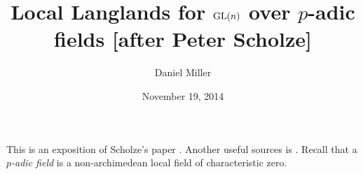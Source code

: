 \documentclass{article}
\title{Local Langlands for \texorpdfstring{$\operatorname{GL}(n)$}{GL(n)} over \texorpdfstring{$p$}{p}-adic fields [after Peter Scholze]}
\author{Daniel Miller}
\date{November 19, 2014}
\begin{document}
\maketitle





This is an exposition of Scholze's paper \cite{scholze-2013}. Another useful 
sources is \cite{vogan-1993}. Recall that a \emph{$p$-adic field} is a 
non-archimedean local field of characteristic zero. 





\printbibliography
\end{document}
